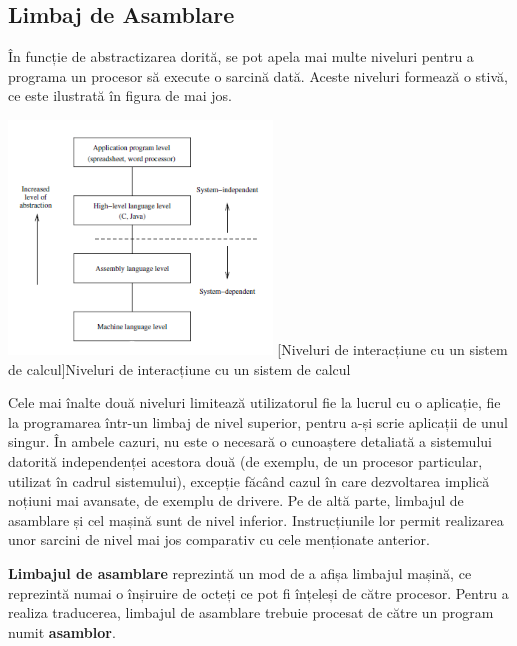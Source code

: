 \documentclass[../../main.tex]{subfiles}
\begin{document}
\subsection{Limbaj de Asamblare}

În funcție de abstractizarea dorită, se pot apela mai multe niveluri pentru a programa un procesor să execute o sarcină dată. Aceste niveluri formează o stivă, ce este ilustrată în figura de mai jos.

\begin{center}
    \includegraphics[width=7cm]{components/images/illustrations/abstraction_levels.png}
    \label{fig:abstraction_levels}
    \captionsetup{justification=centering,margin=1cm}
    [Niveluri de interacțiune cu un sistem de calcul]{Niveluri de interacțiune cu un sistem de calcul\footnotemark}
\end{center}
\vspace{0.3cm}


Cele mai înalte două niveluri limitează utilizatorul fie la lucrul cu o aplicație, fie la programarea într-un limbaj de nivel superior, pentru a-și scrie aplicații de unul singur. În ambele cazuri, nu este o necesară o cunoaștere detaliată a sistemului datorită independenței acestora două (de exemplu, de un procesor particular, utilizat în cadrul sistemului), excepție făcând cazul în care dezvoltarea implică noțiuni mai avansate, de exemplu de drivere. Pe de altă parte, limbajul de asamblare și cel mașină sunt de nivel inferior. Instrucțiunile lor permit realizarea unor sarcini de nivel mai jos comparativ cu cele menționate anterior.

\textbf{Limbajul de asamblare} reprezintă un mod de a afișa limbajul mașină, ce reprezintă numai o înșiruire de octeți ce pot fi înțeleși de către procesor. Pentru a realiza traducerea, limbajul de asamblare trebuie procesat de către un program numit \textbf{asamblor}.
\end{document}
